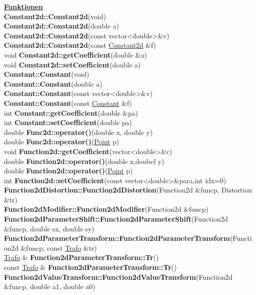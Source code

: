 \documentclass[10pt,titlepage]{article}
\newcommand{\subtitle}[1]{{\noindent\bf#1}}
\def\functionlistentry#1#2#3#4#5#6{\noindent #1 {\bf #2}(#3) \dotfill #6\\}
\begin{document}
{{\subtitle{\hyperlink{SECTION:functions}{Funktionen}}\\
\functionlistentry{}{Constant2d::Constant2d}{void}{1032}{functions}{}
\functionlistentry{}{Constant2d::Constant2d}{double a}{1033}{functions}{}
\functionlistentry{}{Constant2d::Constant2d}{const vector\textless {}double\textgreater  \&v}{1034}{functions}{}
\functionlistentry{}{Constant2d::Constant2d}{const \hyperlink{Constant2d}{Constant2d} \&f}{1035}{functions}{}
\functionlistentry{void}{Constant2d::getCoefficient}{double \&a}{1037}{functions}{}
\functionlistentry{void}{Constant2d::setCoefficient}{double a}{1036}{functions}{}
\functionlistentry{}{Constant::Constant}{void}{997}{functions}{}
\functionlistentry{}{Constant::Constant}{double a}{998}{functions}{}
\functionlistentry{}{Constant::Constant}{const vector\textless {}double\textgreater  \&v}{999}{functions}{}
\functionlistentry{}{Constant::Constant}{const \hyperlink{Constant}{Constant} \&f}{1000}{functions}{}
\functionlistentry{int}{Constant::getCoefficient}{double \&pa}{1002}{functions}{}
\functionlistentry{int}{Constant::setCoefficient}{double pa}{1001}{functions}{}
\functionlistentry{double}{Func2d::operator()}{double x, double y}{1030}{functions}{}
\functionlistentry{double}{Func2d::operator()}{\hyperlink{Point}{Point} p}{1031}{functions}{}
\functionlistentry{void}{Function2d::getCoefficient}{vector\textless {}double\textgreater  \&c}{1021}{functions}{}
\functionlistentry{double}{Function2d::operator()}{double x,doubel y}{1019}{functions}{}
\functionlistentry{double}{Function2d::operator()}{\hyperlink{Point}{Point} p}{1020}{functions}{}
\functionlistentry{int}{Function2d::setCoefficient}{const vector\textless {}double\textgreater  \&para,int idx=0}{1022}{functions}{}
\functionlistentry{}{Function2dDistortion::Function2dDistortion}{Function2d \&funcp, Distortion \&tr}{1059}{functions}{}
\functionlistentry{}{Function2dModifier::Function2dModifier}{Function2d \&funcp}{1054}{functions}{}
\functionlistentry{}{Function2dParameterShift::Function2dParameterShift}{Function2d \&funcp, double sx, double sy}{1055}{functions}{}
\functionlistentry{}{Function2dParameterTransform::Function2dParameterTransform}{Function2d \&funcp, const \hyperlink{Trafo}{Trafo} \&tr}{1056}{functions}{}
\functionlistentry{\hyperlink{Trafo}{Trafo} \&}{Function2dParameterTransform::Tr}{}{1057}{functions}{}
\functionlistentry{const \hyperlink{Trafo}{Trafo} \&}{Function2dParameterTransform::Tr}{}{1058}{functions}{}
\functionlistentry{}{Function2dValueTransform::Function2dValueTransform}{Function2d \&funcp, double a1, double a0}{1060}{functions}{}
}}
\end{document}
